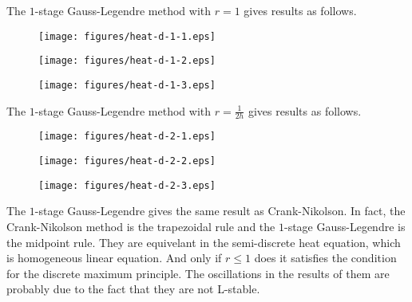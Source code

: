 \documentclass[twocolumn,10pt]{article}
\begin{document}
The $1$-stage Gauss-Legendre method with $r=1$ gives results as follows.

\vspace{-.3em}\begin{figure}[H]
    \centering
    \begin{minipage}[t]{0.32\linewidth}
        \centering
        \texttt{[image: figures/heat-d-1-1.eps]}
    \end{minipage}
    \begin{minipage}[t]{0.32\linewidth}
        \centering
        \texttt{[image: figures/heat-d-1-2.eps]}
    \end{minipage}
    \begin{minipage}[t]{0.32\linewidth}
        \centering
        \texttt{[image: figures/heat-d-1-3.eps]}
    \end{minipage}
\end{figure} \vspace{-.5em}

The $1$-stage Gauss-Legendre method with $r=\frac{1}{2h}$ gives results as follows.

\vspace{-.3em}\begin{figure}[H]
    \centering
    \begin{minipage}[t]{0.32\linewidth}
        \centering
        \texttt{[image: figures/heat-d-2-1.eps]}
    \end{minipage}
    \begin{minipage}[t]{0.32\linewidth}
        \centering
        \texttt{[image: figures/heat-d-2-2.eps]}
    \end{minipage}
    \begin{minipage}[t]{0.32\linewidth}
        \centering
        \texttt{[image: figures/heat-d-2-3.eps]}
    \end{minipage}
\end{figure} \vspace{-.5em}

The $1$-stage Gauss-Legendre gives the same result as Crank-Nikolson.  In fact, the Crank-Nikolson method is the trapezoidal rule and the $1$-stage Gauss-Legendre is the midpoint rule. They are equivelant in the semi-discrete heat equation, which is homogeneous linear equation. And only if $r\leq 1$ does it satisfies the condition for the discrete maximum principle. The oscillations in the results of them are probably due to the fact that they are not L-stable.
\end{document}
